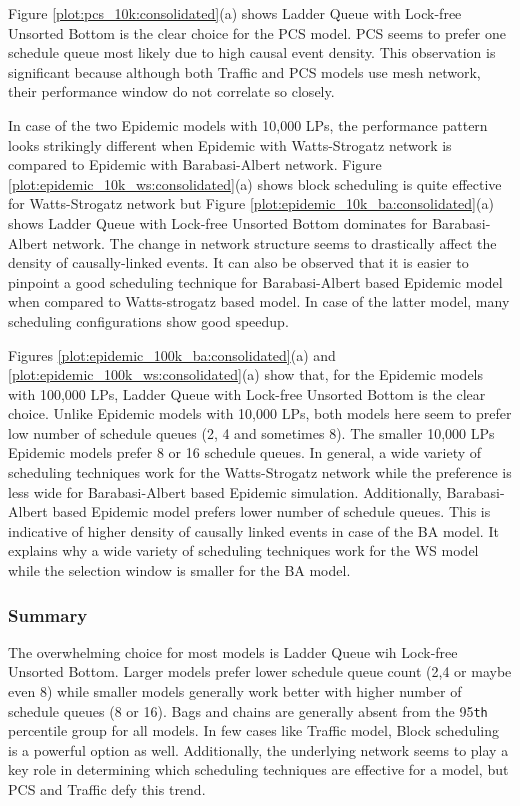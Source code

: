 \documentclass[11pt]{book}
\begin{document}
Figure \ref{plot:pcs_10k:consolidated}(a) shows Ladder Queue with Lock-free Unsorted Bottom is the
clear choice for the PCS model. PCS seems to prefer one schedule queue most likely due to high causal
event density. This observation is significant because although both Traffic and PCS models use mesh
network, their performance window do not correlate so closely.

In case of the two Epidemic models with 10,000 LPs, the performance pattern looks strikingly
different when Epidemic with Watts-Strogatz network is compared to Epidemic with Barabasi-Albert
network. Figure \ref{plot:epidemic_10k_ws:consolidated}(a) shows block scheduling is quite effective
for Watts-Strogatz network but Figure \ref{plot:epidemic_10k_ba:consolidated}(a) shows Ladder Queue
with Lock-free Unsorted Bottom dominates for Barabasi-Albert network. The change in network structure
seems to drastically affect the density of causally-linked events. It can also be observed that it
is easier to pinpoint a good scheduling technique for Barabasi-Albert based Epidemic model when
compared to Watts-strogatz based model. In case of the latter model, many scheduling configurations
show good speedup.

Figures \ref{plot:epidemic_100k_ba:consolidated}(a) and \ref{plot:epidemic_100k_ws:consolidated}(a)
show that, for the Epidemic models with 100,000 LPs, Ladder Queue with Lock-free Unsorted Bottom is
the clear choice. Unlike Epidemic models with 10,000 LPs, both models here seem to prefer low number
of schedule queues (2, 4 and sometimes 8). The smaller 10,000 LPs Epidemic models prefer 8 or 16
schedule queues. In general, a wide variety of scheduling techniques work for the Watts-Strogatz
network while the preference is less wide for Barabasi-Albert based Epidemic simulation. Additionally,
Barabasi-Albert based Epidemic model prefers lower number of schedule queues. This is indicative of
higher density of causally linked events in case of the BA model. It explains why a wide variety of
scheduling techniques work for the WS model while the selection window is smaller for the BA model.

\subsubsection{Summary}
\label{subsubsec:summary_top}
The overwhelming choice for most models is Ladder Queue wih Lock-free Unsorted Bottom. Larger models
prefer lower schedule queue count (2,4 or maybe even 8) while smaller models generally work better
with higher number of schedule queues (8 or 16). Bags and chains are generally absent from the
95\texttt{th} percentile group for all models. In few cases like Traffic model, Block scheduling is a
powerful option as well. Additionally, the underlying network seems to play a key role in determining
which scheduling techniques are effective for a model, but PCS and Traffic defy this trend.
\end{document}
